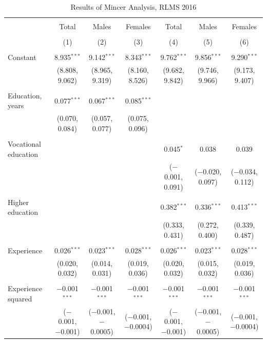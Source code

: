 \documentclass[12pt,a4paper]{article}
\numberwithin{equation}{section}
\begin{document}
\begin{landscape}
	
	\fontsize{9}{11}
	\selectfont
	
	\begin{table}[!htbp] \centering 
		\caption{Results of Mincer Analysis, RLMS 2016} 
		\label{} 
		\begin{tabular}{@{\extracolsep{5pt}}lcccccc} 
			\\[-1.8ex]\hline 
			\hline \\[-1.8ex] 
			& Total & Males & Females & Total & Males & Females \\ 
			\\[-1.8ex] & (1) & (2) & (3) & (4) & (5) & (6)\\ 
			\hline \\[-1.8ex] 
			Constant & 8.935$^{***}$ & 9.142$^{***}$ & 8.343$^{***}$ & 9.762$^{***}$ & 9.856$^{***}$ & 9.290$^{***}$ \\ 
			& (8.808, 9.062) & (8.965, 9.319) & (8.160, 8.526) & (9.682, 9.842) & (9.746, 9.966) & (9.173, 9.407) \\ 
			& & & & & & \\ 
			Education, years & 0.077$^{***}$ & 0.067$^{***}$ & 0.085$^{***}$ &  &  &  \\ 
			& (0.070, 0.084) & (0.057, 0.077) & (0.075, 0.096) &  &  &  \\ 
			& & & & & & \\ 
			Vocational education &  &  &  & 0.045$^{*}$ & 0.038 & 0.039 \\ 
			&  &  &  & ($-$0.001, 0.091) & ($-$0.020, 0.097) & ($-$0.034, 0.112) \\ 
			& & & & & & \\ 
			Higher education &  &  &  & 0.382$^{***}$ & 0.336$^{***}$ & 0.413$^{***}$ \\ 
			&  &  &  & (0.333, 0.431) & (0.272, 0.400) & (0.339, 0.487) \\ 
			& & & & & & \\ 
			Experience & 0.026$^{***}$ & 0.023$^{***}$ & 0.028$^{***}$ & 0.026$^{***}$ & 0.023$^{***}$ & 0.028$^{***}$ \\ 
			& (0.020, 0.032) & (0.014, 0.031) & (0.019, 0.036) & (0.020, 0.032) & (0.015, 0.032) & (0.019, 0.036) \\ 
			& & & & & & \\ 
			Experience squared & $-$0.001$^{***}$ & $-$0.001$^{***}$ & $-$0.001$^{***}$ & $-$0.001$^{***}$ & $-$0.001$^{***}$ & $-$0.001$^{***}$ \\ 
			& ($-$0.001, $-$0.001) & ($-$0.001, $-$0.0005) & ($-$0.001, $-$0.0004) & ($-$0.001, $-$0.001) & ($-$0.001, $-$0.0005) & ($-$0.001, $-$0.0004) \\ 

\end{tabular}
\end{table}
\end{landscape}
\end{document}
